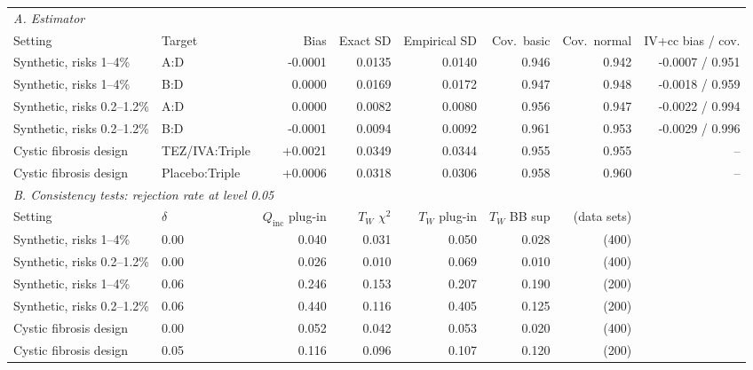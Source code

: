 \begin{tabular}{llrrrrrr}
\toprule
\multicolumn{8}{l}{\emph{A. Estimator}} \\
Setting & Target & Bias & Exact SD & Empirical SD & Cov.\ basic & Cov.\ normal & IV+cc bias / cov. \\
\midrule
Synthetic, risks 1--4\% & A:D & -0.0001 & 0.0135 & 0.0140 & 0.946 & 0.942 & -0.0007 / 0.951 \\
Synthetic, risks 1--4\% & B:D & 0.0000 & 0.0169 & 0.0172 & 0.947 & 0.948 & -0.0018 / 0.959 \\
Synthetic, risks 0.2--1.2\% & A:D & 0.0000 & 0.0082 & 0.0080 & 0.956 & 0.947 & -0.0022 / 0.994 \\
Synthetic, risks 0.2--1.2\% & B:D & -0.0001 & 0.0094 & 0.0092 & 0.961 & 0.953 & -0.0029 / 0.996 \\
Cystic fibrosis design & TEZ/IVA:Triple & +0.0021 & 0.0349 & 0.0344 & 0.955 & 0.955 & -- \\
Cystic fibrosis design & Placebo:Triple & +0.0006 & 0.0318 & 0.0306 & 0.958 & 0.960 & -- \\
\midrule
\multicolumn{8}{l}{\emph{B. Consistency tests: rejection rate at level 0.05}} \\
Setting & $\delta$ & $Q_{\mathrm{inc}}$ plug-in & $T_W$ $\chi^2$ & $T_W$ plug-in & $T_W$ BB sup & (data sets) & \\
\midrule
Synthetic, risks 1--4\% & 0.00 & 0.040 & 0.031 & 0.050 & 0.028 & (400) & \\
Synthetic, risks 0.2--1.2\% & 0.00 & 0.026 & 0.010 & 0.069 & 0.010 & (400) & \\
Synthetic, risks 1--4\% & 0.06 & 0.246 & 0.153 & 0.207 & 0.190 & (200) & \\
Synthetic, risks 0.2--1.2\% & 0.06 & 0.440 & 0.116 & 0.405 & 0.125 & (200) & \\
Cystic fibrosis design & 0.00 & 0.052 & 0.042 & 0.053 & 0.020 & (400) & \\
Cystic fibrosis design & 0.05 & 0.116 & 0.096 & 0.107 & 0.120 & (200) & \\
\bottomrule
\end{tabular}
